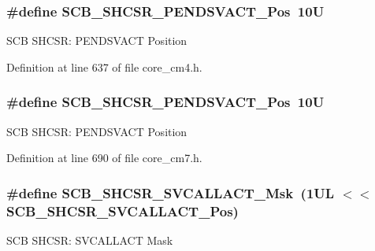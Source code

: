 \subsubsection[{\texorpdfstring{S\+C\+B\+\_\+\+S\+H\+C\+S\+R\+\_\+\+P\+E\+N\+D\+S\+V\+A\+C\+T\+\_\+\+Pos}{SCB_SHCSR_PENDSVACT_Pos}}]{\setlength{\rightskip}{0pt plus 5cm}\#define S\+C\+B\+\_\+\+S\+H\+C\+S\+R\+\_\+\+P\+E\+N\+D\+S\+V\+A\+C\+T\+\_\+\+Pos~10U}\hypertarget{group___c_m_s_i_s___s_c_b_ga9b9fa69ce4c5ce7fe0861dbccfb15939}{}\label{group___c_m_s_i_s___s_c_b_ga9b9fa69ce4c5ce7fe0861dbccfb15939}
S\+CB S\+H\+C\+SR\+: P\+E\+N\+D\+S\+V\+A\+CT Position 

Definition at line 637 of file core\+\_\+cm4.\+h.

\subsubsection[{\texorpdfstring{S\+C\+B\+\_\+\+S\+H\+C\+S\+R\+\_\+\+P\+E\+N\+D\+S\+V\+A\+C\+T\+\_\+\+Pos}{SCB_SHCSR_PENDSVACT_Pos}}]{\setlength{\rightskip}{0pt plus 5cm}\#define S\+C\+B\+\_\+\+S\+H\+C\+S\+R\+\_\+\+P\+E\+N\+D\+S\+V\+A\+C\+T\+\_\+\+Pos~10U}\hypertarget{group___c_m_s_i_s___s_c_b_ga9b9fa69ce4c5ce7fe0861dbccfb15939}{}\label{group___c_m_s_i_s___s_c_b_ga9b9fa69ce4c5ce7fe0861dbccfb15939}
S\+CB S\+H\+C\+SR\+: P\+E\+N\+D\+S\+V\+A\+CT Position 

Definition at line 690 of file core\+\_\+cm7.\+h.

\subsubsection[{\texorpdfstring{S\+C\+B\+\_\+\+S\+H\+C\+S\+R\+\_\+\+S\+V\+C\+A\+L\+L\+A\+C\+T\+\_\+\+Msk}{SCB_SHCSR_SVCALLACT_Msk}}]{\setlength{\rightskip}{0pt plus 5cm}\#define S\+C\+B\+\_\+\+S\+H\+C\+S\+R\+\_\+\+S\+V\+C\+A\+L\+L\+A\+C\+T\+\_\+\+Msk~(1\+U\+L $<$$<$ S\+C\+B\+\_\+\+S\+H\+C\+S\+R\+\_\+\+S\+V\+C\+A\+L\+L\+A\+C\+T\+\_\+\+Pos)}\hypertarget{group___c_m_s_i_s___s_c_b_ga634c0f69a233475289023ae5cb158fdf}{}\label{group___c_m_s_i_s___s_c_b_ga634c0f69a233475289023ae5cb158fdf}
S\+CB S\+H\+C\+SR\+: S\+V\+C\+A\+L\+L\+A\+CT Mask 


